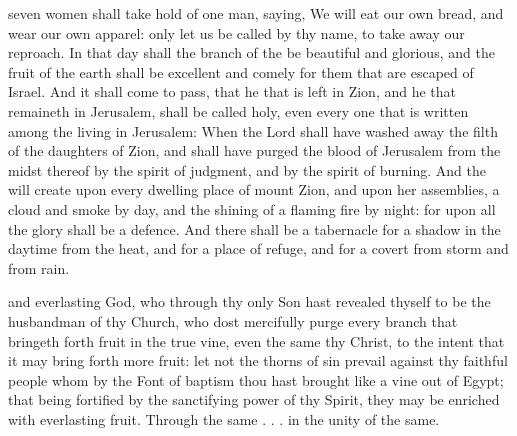  seven women shall take hold of one man, saying, We will eat our own bread, and wear our own apparel: only let us be called by thy name, to take away our reproach. In that day shall the branch of the  be beautiful and glorious, and the fruit of the earth shall be excellent and comely for them that are escaped of Israel. And it shall come to pass, that he that is left in Zion, and he that remaineth in Jerusalem, shall be called holy, even every one that is written among the living in Jerusalem: When the Lord shall have washed away the filth of the daughters of Zion, and shall have purged the blood of Jerusalem from the midst thereof by the spirit of judgment, and by the spirit of burning. And the  will create upon every dwelling place of mount Zion, and upon her assemblies, a cloud and smoke by day, and the shining of a flaming fire by night: for upon all the glory shall be a defence. And there shall be a tabernacle for a shadow in the daytime from the heat, and for a place of refuge, and for a covert from storm and from rain.


{} and everlasting God, who through thy only Son hast revealed thyself to be the husbandman of thy Church, who dost mercifully purge every branch that bringeth forth fruit in the true vine, even the same thy Christ, to the intent that it may bring forth more fruit: let not the thorns of sin prevail against thy faithful people whom by the Font of baptism thou hast brought like a vine out of Egypt; that being fortified by the sanctifying power of thy Spirit, they may be enriched with everlasting fruit. Through the same . . . in the unity of the same.

